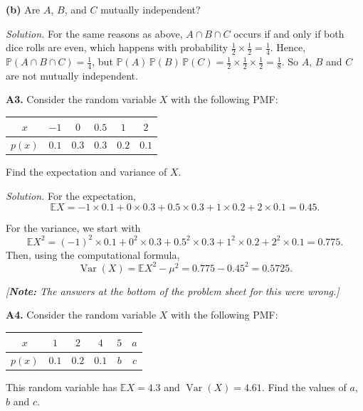 \documentclass[
  a4paper,
]{book}
\theoremstyle{definition}
\theoremstyle{definition}
\theoremstyle{definition}
\theoremstyle{definition}
\theoremstyle{remark}
\begin{document}
\textbf{(b)} Are \(A\), \(B\), and \(C\) mutually independent?

\begin{myanswers}
\emph{Solution.}
For the same reasons as above, \(A \cap B \cap C\) occurs if and only if both dice rolls are even, which happens with probability \(\frac12\times\frac12 = \frac14\). Hence, \(\mathbb P(A \cap B \cap C) = \frac14\), but \(\mathbb P(A)\,\mathbb P(B)\,\mathbb P(C) = \frac12\times\frac12\times\frac12 = \frac18\). So \(A\), \(B\) and \(C\) are not mutually independent.

\end{myanswers}

\textbf{A3.} Consider the random variable \(X\) with the following PMF:

\begin{longtable}[]{@{}cccccc@{}}
\toprule
\(x\) & \(-1\) & \(0\) & \(0.5\) & \(1\) & \(2\) \\
\midrule
\endhead
\(p(x)\) & \(0.1\) & \(0.3\) & \(0.3\) & \(0.2\) & \(0.1\) \\
\bottomrule
\end{longtable}

Find the expectation and variance of \(X\).

\begin{myanswers}
\emph{Solution.}
For the expectation,
\[ \mathbb EX = -1\times0.1 + 0\times0.3 + 0.5\times0.3+1\times0.2+2\times0.1 = 0.45. \]

For the variance, we start with
\[ \mathbb EX^2 = (-1)^2\times0.1 + 0^2\times0.3 + 0.5^2\times0.3+1^2\times0.2+2^2\times0.1 = 0.775 . \]
Then, using the computational formula,
\[ \operatorname{Var}(X) = \mathbb EX^2 - \mu^2 = 0.775 - 0.45^2 = 0.5725. \]

\emph{{[}\textbf{Note:} The answers at the bottom of the problem sheet for this were wrong.{]}}

\end{myanswers}

\textbf{A4.} Consider the random variable \(X\) with the following PMF:

\begin{longtable}[]{@{}cccccc@{}}
\toprule
\(x\) & \(1\) & \(2\) & \(4\) & \(5\) & \(a\) \\
\midrule
\endhead
\(p(x)\) & \(0.1\) & \(0.2\) & \(0.1\) & \(b\) & \(c\) \\
\bottomrule
\end{longtable}

This random variable has \(\mathbb EX = 4.3\) and \(\operatorname{Var}(X) = 4.61\). Find the values of \(a\), \(b\) and \(c\).
\end{document}
